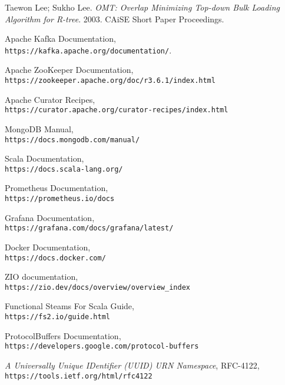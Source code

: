 \documentclass[14pt]{article}
\begin{document}
\begin{thebibliography}{9}
Taewon Lee; Sukho Lee. \textit{OMT: Overlap Minimizing Top-down Bulk Loading Algorithm for R-tree}. 2003. CAiSE Short Paper Proceedings.

Apache Kafka Documentation,\\
\texttt{https://kafka.apache.org/documentation/}.

Apache ZooKeeper Documentation,\\
\texttt{https://zookeeper.apache.org/doc/r3.6.1/index.html}

Apache Curator Recipes,\\
\texttt{https://curator.apache.org/curator-recipes/index.html}

MongoDB Manual,\\
\texttt{https://docs.mongodb.com/manual/}

Scala Documentation,\\
\texttt{https://docs.scala-lang.org/}

Prometheus Documentation,\\
\texttt{https://prometheus.io/docs}

Grafana Documentation,\\
\texttt{https://grafana.com/docs/grafana/latest/}

Docker Documentation,\\
\texttt{https://docs.docker.com/}

ZIO documentation,\\
\texttt{https://zio.dev/docs/overview/overview\_index}

Functional Steams For Scala Guide,\\
\texttt{https://fs2.io/guide.html}

ProtocolBuffers Documentation,\\
\texttt{https://developers.google.com/protocol-buffers}

\textit{A Universally Unique IDentifier (UUID) URN Namespace},
RFC-4122,\\
\texttt{https://tools.ietf.org/html/rfc4122}

\end{thebibliography}
\end{document}
